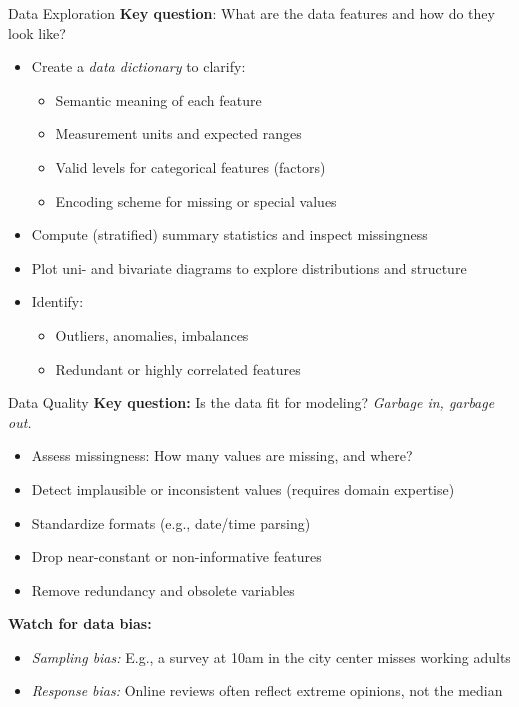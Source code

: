 \documentclass[ignorenonframetext,]{beamer}
\providecommand{\tightlist}{%
  \setlength{\itemsep}{0pt}\setlength{\parskip}{0pt}}
\begin{document}
\begin{frame}{Data Exploration}
\label{data-exploration}
\textbf{Key question}: What are the data features and how do they look like?
\begin{itemize}
\tightlist
\item Create a \emph{data dictionary} to clarify:

  \begin{itemize}
  \tightlist
\item Semantic meaning of each feature
    \item Measurement units and expected ranges
    \item Valid levels for categorical features (factors)
    \item Encoding scheme for missing or special values
  \end{itemize}
\item  Compute (stratified) summary statistics and inspect missingness
\item  Plot uni- and bivariate diagrams to explore distributions and structure
  \item Identify:
  \begin{itemize}
    \item Outliers, anomalies, imbalances
    \item Redundant or highly correlated features
  \end{itemize}
\end{itemize}
\end{frame}

\begin{frame}{Data Quality}
\label{data-quality}
\textbf{Key question:} Is the data fit for modeling? \emph{Garbage in, garbage out.}

\begin{itemize}
  \item Assess missingness: How many values are missing, and where?
  \item Detect implausible or inconsistent values (requires domain expertise)
  \item Standardize formats (e.g., date/time parsing)
  \item Drop near-constant or non-informative features
  \item Remove redundancy and obsolete variables
\end{itemize}

\vspace{0.5em}
\textbf{Watch for data bias:}
\begin{itemize}
  \item \textit{Sampling bias:} E.g., a survey at 10am in the city center misses working adults
  \item \textit{Response bias:} Online reviews often reflect extreme opinions, not the median
\end{itemize}
\end{frame}
\end{document}
